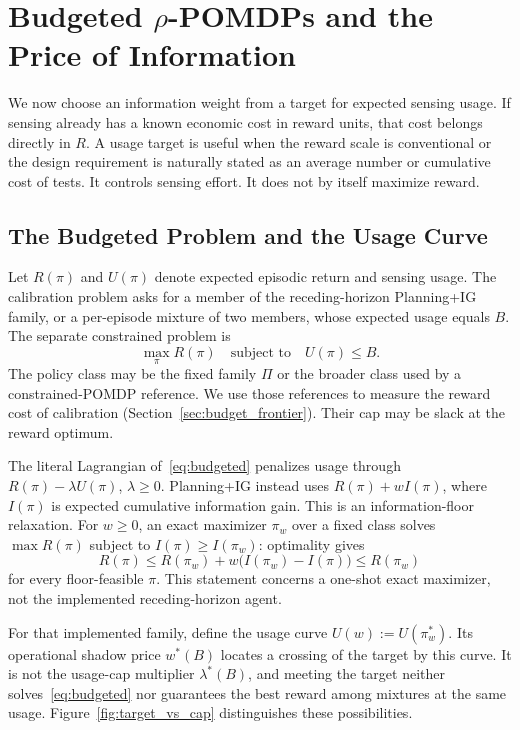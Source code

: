 \section{Budgeted $\rho$-POMDPs and the Price of Information}
\label{sec:budget}

We now choose an information weight from a target for expected sensing usage. If sensing already has a known economic cost in reward units, that cost belongs directly in $R$. A usage target is useful when the reward scale is conventional or the design requirement is naturally stated as an average number or cumulative cost of tests. It controls sensing effort. It does not by itself maximize reward.

\subsection{The Budgeted Problem and the Usage Curve}
\label{sec:budget_theory}

Let $R(\pi)$ and $U(\pi)$ denote expected episodic return and sensing usage. The calibration problem asks for a member of the receding-horizon Planning+IG family, or a per-episode mixture of two members, whose expected usage equals $B$. The separate constrained problem is
\begin{equation}
\label{eq:budgeted}
\max_\pi R(\pi)\quad\text{subject to}\quad U(\pi)\le B.
\end{equation}
The policy class may be the fixed family $\Pi$ or the broader class used by a constrained-POMDP reference. We use those references to measure the reward cost of calibration (Section~\ref{sec:budget_frontier}). Their cap may be slack at the reward optimum.

The literal Lagrangian of~\eqref{eq:budgeted} penalizes usage through $R(\pi)-\lambda U(\pi)$, $\lambda\ge0$. Planning+IG instead uses $R(\pi)+wI(\pi)$, where $I(\pi)$ is expected cumulative information gain. This is an information-floor relaxation. For $w\ge0$, an exact maximizer $\pi_w$ over a fixed class solves $\max R(\pi)$ subject to $I(\pi)\ge I(\pi_w)$: optimality gives
\[
R(\pi)\le R(\pi_w)+w\big(I(\pi_w)-I(\pi)\big)\le R(\pi_w)
\]
for every floor-feasible $\pi$. This statement concerns a one-shot exact maximizer, not the implemented receding-horizon agent.

For that implemented family, define the usage curve $U(w):=U(\pi^*_w)$. Its operational shadow price $w^*(B)$ locates a crossing of the target by this curve. It is not the usage-cap multiplier $\lambda^*(B)$, and meeting the target neither solves~\eqref{eq:budgeted} nor guarantees the best reward among mixtures at the same usage. Figure~\ref{fig:target_vs_cap} distinguishes these possibilities.

